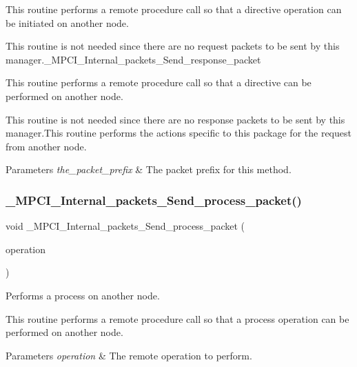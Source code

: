 This routine performs a remote procedure call so that a directive operation can be initiated on another node.

This routine is not needed since there are no request packets to be sent by this manager.\+\_\+\+M\+P\+C\+I\+\_\+\+Internal\+\_\+packets\+\_\+\+Send\+\_\+response\+\_\+packet

This routine performs a remote procedure call so that a directive can be performed on another node.

This routine is not needed since there are no response packets to be sent by this manager.\+This routine performs the actions specific to this package for the request from another node.


\begin{DoxyParams}{Parameters}
{\em the\+\_\+packet\+\_\+prefix} & The packet prefix for this method. \\
\hline
\end{DoxyParams}
\mbox{\label{group__RTEMSScoreMPCI_ga63356f90abac093ad7d8817cedf1da28}} 
\subsubsection{\texorpdfstring{\_MPCI\_Internal\_packets\_Send\_process\_packet()}{\_MPCI\_Internal\_packets\_Send\_process\_packet()}}
{\footnotesize\ttfamily void \+\_\+\+M\+P\+C\+I\+\_\+\+Internal\+\_\+packets\+\_\+\+Send\+\_\+process\+\_\+packet (\begin{DoxyParamCaption}\item[{\mbox{\hyperlink{group__RTEMSScoreMPCI_ga04a2fa1c1617558e729e75700624cdb7}{M\+P\+C\+I\+\_\+\+Internal\+\_\+\+Remote\+\_\+operations}}}]{operation }\end{DoxyParamCaption})}



Performs a process on another node. 

This routine performs a remote procedure call so that a process operation can be performed on another node.


\begin{DoxyParams}{Parameters}
{\em operation} & The remote operation to perform. \\
\hline
\end{DoxyParams}
\mbox{\label{group__RTEMSScoreMPCI_gae2df57913a498a0305315a2fb6cf12fb}} 
